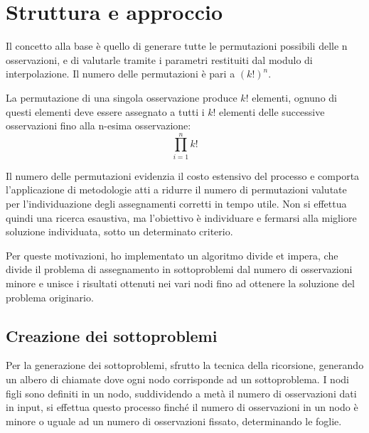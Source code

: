 \documentclass[a4paper,12pt]{report}
\begin{document}
\section{Struttura e approccio}
\label{s:struttura}
Il concetto alla base è quello di generare tutte le permutazioni possibili delle n osservazioni, e di valutarle tramite i parametri restituiti dal modulo di interpolazione. Il numero delle permutazioni è pari a $(k!)^{n}$.

La permutazione di una singola osservazione produce $k!$ elementi, ognuno di questi elementi deve essere assegnato a tutti i $k!$ elementi delle successive osservazioni fino alla n-esima osservazione:
\begin{equation}
 \label{numPerm}
  \prod_{i=1}^{n}k!
\end{equation}

Il numero delle permutazioni evidenzia il costo estensivo del processo e comporta l'applicazione di metodologie atti a ridurre il numero di permutazioni valutate per l'individuazione degli assegnamenti corretti in tempo utile. Non si effettua quindi una ricerca esaustiva, ma l'obiettivo è individuare e fermarsi alla migliore soluzione individuata, sotto un determinato criterio.

Per queste motivazioni, ho implementato un algoritmo divide et impera, che divide il problema di assegnamento in sottoproblemi dal numero di osservazioni minore e unisce i risultati ottenuti nei vari nodi fino ad ottenere la soluzione del problema originario.

\subsection{Creazione dei sottoproblemi}

  Per la generazione dei sottoproblemi, sfrutto la tecnica della ricorsione, generando un albero di chiamate dove ogni nodo corrisponde ad un sottoproblema.
  I nodi figli sono definiti in un nodo, suddividendo a metà il numero di osservazioni dati in input, si effettua questo processo finché il numero di osservazioni in un nodo è minore o uguale ad un numero di osservazioni fissato, determinando le foglie.
\end{document}
